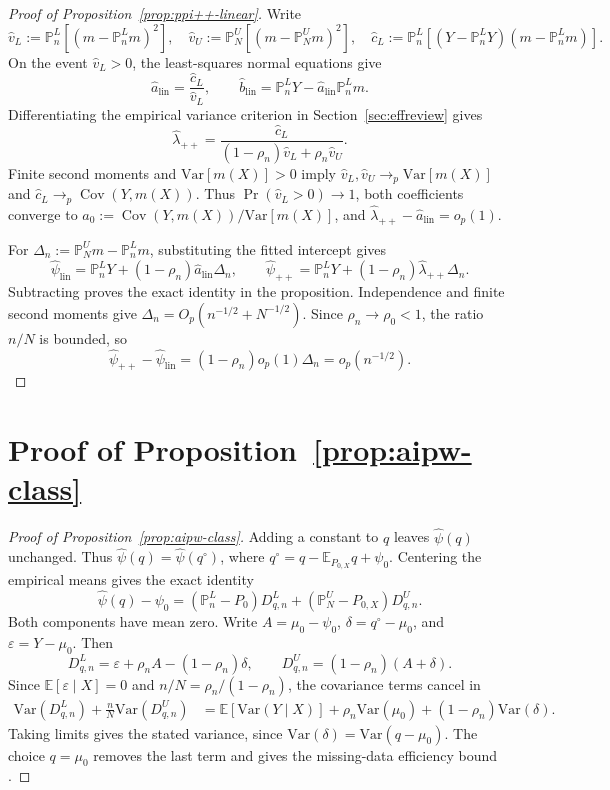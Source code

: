 \documentclass{article}
\theoremstyle{plain}
\theoremstyle{definition}
\newcommand{\E}{\mathbb{E}}
\newcommand{\Var}{\mathrm{Var}}
\newcommand{\1}{\mathbf{1}}
\newcommand{\rhozero}{\rho_0}
\newcommand{\rhon}{\rho_n}
\newcommand{\Pl}{\mathbb{P}^{L}_n}
\newcommand{\Pu}{\mathbb{P}^{U}_N}
\newcommand{\Px}{P_{0,X}}
\newcommand{\Cov}{\operatorname{Cov}}
\begin{document}
\begin{proof}[Proof of Proposition~\ref{prop:ppi++-linear}]
Write
\[
\hat v_L:=\Pl[(m-\Pl m)^2],\quad
\hat v_U:=\Pu[(m-\Pu m)^2],\quad
\hat c_L:=\Pl[(Y-\Pl Y)(m-\Pl m)].
\]
On the event \(\hat v_L>0\), the least-squares normal equations give
\[
\hat a_{\mathrm{lin}}=\frac{\hat c_L}{\hat v_L},
\qquad
\hat b_{\mathrm{lin}}=\Pl Y-\hat a_{\mathrm{lin}}\Pl m.
\]
Differentiating the empirical variance criterion in Section~\ref{sec:effreview} gives
\[
\hat\lambda_{++}
=\frac{\hat c_L}{(1-\rhon)\hat v_L+\rhon\hat v_U}.
\]
Finite second moments and \(\Var[m(X)]>0\) imply
\(\hat v_L,\hat v_U\to_p\Var[m(X)]\) and
\(\hat c_L\to_p\Cov(Y,m(X))\).
Thus \(\Pr(\hat v_L>0)\to1\), both coefficients converge to
\(a_0:=\Cov(Y,m(X))/\Var[m(X)]\), and
\(\hat\lambda_{++}-\hat a_{\mathrm{lin}}=o_p(1)\).

For \(\Delta_n:=\Pu m-\Pl m\), substituting the fitted intercept gives
\[
\widehat\psi_{\mathrm{lin}}=\Pl Y+(1-\rhon)\hat a_{\mathrm{lin}}\Delta_n,
\qquad
\widehat\psi_{++}=\Pl Y+(1-\rhon)\hat\lambda_{++}\Delta_n.
\]
Subtracting proves the exact identity in the proposition.
Independence and finite second moments give
\(\Delta_n=O_p(n^{-1/2}+N^{-1/2})\).
Since \(\rhon\to\rhozero<1\), the ratio \(n/N\) is bounded, so
\[
\widehat\psi_{++}-\widehat\psi_{\mathrm{lin}}
=(1-\rhon)o_p(1)\Delta_n=o_p(n^{-1/2}).
\]
\end{proof}

\section{Proof of Proposition~\ref{prop:aipw-class}}
\label{app:eif}

\begin{proof}[Proof of Proposition~\ref{prop:aipw-class}]
Adding a constant to \(q\) leaves \(\widehat\psi(q)\) unchanged.
Thus \(\widehat\psi(q)=\widehat\psi(q^\circ)\), where
\(q^\circ=q-\E_{\Px}q+\psi_0\).
Centering the empirical means gives the exact identity
\[
\widehat\psi(q)-\psi_0
=(\Pl-P_0)D_{q,n}^L+(\Pu-\Px)D_{q,n}^U.
\]
Both components have mean zero.
Write \(A=\mu_0-\psi_0\), \(\delta=q^\circ-\mu_0\),
and \(\varepsilon=Y-\mu_0\). Then
\[
D_{q,n}^L=\varepsilon+\rhon A-(1-\rhon)\delta,
\qquad
D_{q,n}^U=(1-\rhon)(A+\delta).
\]
Since \(\E[\varepsilon\mid X]=0\) and
\(n/N=\rhon/(1-\rhon)\), the covariance terms cancel in
\begin{align*}
\Var(D_{q,n}^L)+\frac nN\Var(D_{q,n}^U)
&=\E[\Var(Y\mid X)]+\rhon\Var(\mu_0)
+(1-\rhon)\Var(\delta).
\end{align*}
Taking limits gives the stated variance, since
\(\Var(\delta)=\Var(q-\mu_0)\).
The choice \(q=\mu_0\) removes the last term and gives the
missing-data efficiency bound
\citep{robins1995analysis,robins1995semiparametric,tsiatis2006semiparametric}.
\end{proof}
\end{document}
